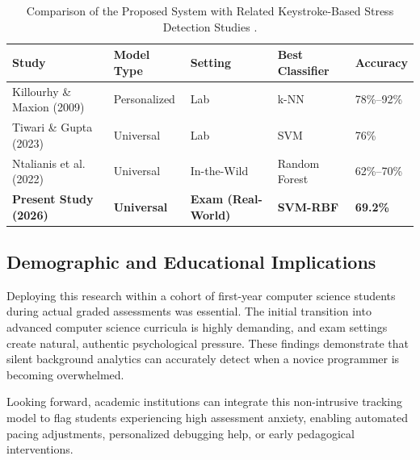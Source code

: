 \begin{table}[htbp]
    \centering
    \small
    \begin{tabular}{|p{3.8cm}|p{2.0cm}|p{1.8cm}|p{2.0cm}|p{2.0cm}|}
        \hline
        \textbf{Study} & \textbf{Model Type} & \textbf{Setting} & \textbf{Best Classifier} & \textbf{Accuracy} \\ \hline
        Killourhy \& Maxion (2009) & Personalized & Lab & k-NN & 78\%--92\% \\ \hline
        Tiwari \& Gupta (2023) & Universal & Lab & SVM & 76\% \\ \hline
        Ntalianis et al. (2022) & Universal & In-the-Wild & Random Forest & 62\%--70\% \\ \hline
        \textbf{Present Study (2026)} & \textbf{Universal} & \textbf{Exam (Real-World)} & \textbf{SVM-RBF} & \textbf{69.2\%} \\ \hline
    \end{tabular}
    \caption{Comparison of the Proposed System with Related Keystroke-Based Stress Detection Studies \cite{cmuKeystroke, ijritcc2023, researchgateKeystroke}.}
    \label{tab:comparison}
\end{table}

\subsection{Demographic and Educational Implications}
Deploying this research within a cohort of first-year computer science students during actual graded assessments was essential. The initial transition into advanced computer science curricula is highly demanding, and exam settings create natural, authentic psychological pressure. These findings demonstrate that silent background analytics can accurately detect when a novice programmer is becoming overwhelmed. 

\noindent Looking forward, academic institutions can integrate this non-intrusive tracking model to flag students experiencing high assessment anxiety, enabling automated pacing adjustments, personalized debugging help, or early pedagogical interventions.

